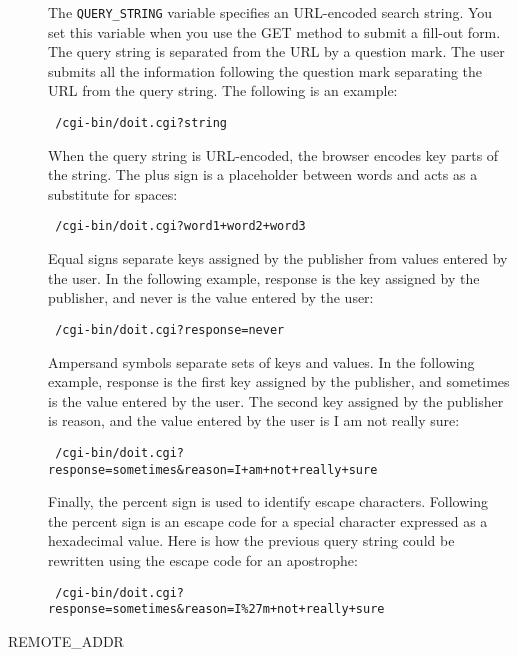 \begin{description}
The \verb|QUERY_STRING| variable specifies an URL-encoded search string. You set
this variable when you use the GET method to submit a fill-out form. The query string is
separated from the URL by a question mark. The user submits all the
information following the question mark separating the URL from the query
string. The following is an example:

\begin{verbatim}
 /cgi-bin/doit.cgi?string
\end{verbatim}

When the query string is URL-encoded, the browser encodes key parts of the
string. The plus sign is a placeholder between words and acts as a
substitute for spaces:

\begin{verbatim}
 /cgi-bin/doit.cgi?word1+word2+word3
\end{verbatim}

Equal signs separate keys assigned by the publisher from values entered by
the user. In the following example, response is the key assigned by the
publisher, and never is the value entered by the user:

\begin{verbatim}
 /cgi-bin/doit.cgi?response=never
\end{verbatim}

Ampersand symbols separate sets of keys and values. In the following
example, response is the first key assigned by the publisher, and
sometimes is the value entered by the user. The second key assigned by the
publisher is reason, and the value entered by the user is I am not really
sure:

{\footnotesize
\begin{verbatim}
 /cgi-bin/doit.cgi?response=sometimes&reason=I+am+not+really+sure
\end{verbatim}
}

Finally, the percent sign is used to identify escape characters. Following
the percent sign is an escape code for a special character expressed as a
hexadecimal value. Here is how the previous query string could be
rewritten using the escape code for an apostrophe:

{\footnotesize
\begin{verbatim}
 /cgi-bin/doit.cgi?response=sometimes&reason=I%27m+not+really+sure
\end{verbatim}
}


\item[REMOTE\_ADDR]


\end{description}
